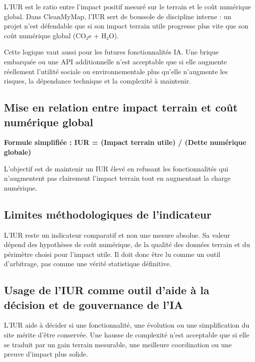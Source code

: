 \documentclass[
  10pt,
  a4paper,
  DIV=11,
  numbers=noendperiod,
  oneside]{scrreprt}
\let\oldtextbf\textbf
\renewcommand{\textbf}[1]{\oldtextbf{\textcolor{cmmnavy}{#1}}}
\begin{document}
L'IUR est le ratio entre l'impact positif mesuré sur le terrain et le
coût numérique global. Dans CleanMyMap, l'IUR sert de boussole de
discipline interne : un projet n'est défendable que si son impact
terrain utile progresse plus vite que son coût numérique global (CO₂e +
H₂O).

Cette logique vaut aussi pour les futures fonctionnalités IA. Une brique
embarquée ou une API additionnelle n'est acceptable que si elle augmente
réellement l'utilité sociale ou environnementale plus qu'elle n'augmente
les risques, la dépendance technique et la complexité à maintenir.

\subsection{Mise en relation entre impact terrain et coût numérique
global}\label{mise-en-relation-entre-impact-terrain-et-couxfbt-numuxe9rique-global}

\textbf{Formule simplifiée : IUR = (Impact terrain utile) / (Dette
numérique globale)}

L'objectif est de maintenir un IUR élevé en refusant les fonctionnalités
qui n'augmentent pas clairement l'impact terrain tout en augmentant la
charge numérique.

\subsection{Limites méthodologiques de
l'indicateur}\label{limites-muxe9thodologiques-de-lindicateur}

L'IUR reste un indicateur comparatif et non une mesure absolue. Sa
valeur dépend des hypothèses de coût numérique, de la qualité des
données terrain et du périmètre choisi pour l'impact utile. Il doit donc
être lu comme un outil d'arbitrage, pas comme une vérité statistique
définitive.

\subsection{Usage de l'IUR comme outil d'aide à la décision et de
gouvernance de
l'IA}\label{usage-de-liur-comme-outil-daide-uxe0-la-duxe9cision-et-de-gouvernance-de-lia}

L'IUR aide à décider si une fonctionnalité, une évolution ou une
simplification du site mérite d'être conservée. Une hausse de complexité
n'est acceptable que si elle se traduit par un gain terrain mesurable,
une meilleure coordination ou une preuve d'impact plus solide.
\end{document}
